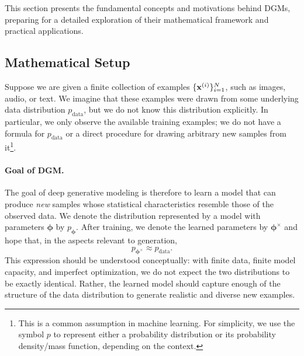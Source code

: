 

This section presents the fundamental concepts and motivations behind DGMs, preparing for a detailed exploration of their mathematical framework and practical applications.


\subsection{Mathematical Setup}\label{subsec:intro-math-setup}
Suppose we are given a finite collection of examples
$\{{\mathbf{x}}^{(i)}\}_{i=1}^N$, such as images, audio, or text.
We imagine that these examples were drawn from some underlying data distribution
$p_{\mathrm{data}}$, but we do not know this distribution explicitly.
In particular, we only observe the available training examples; we do not have a
formula for $p_{\mathrm{data}}$ or a direct procedure for drawing arbitrary new
samples from it\footnote{This is a common assumption in machine learning. For simplicity, we use the symbol $ p $ to represent either a probability distribution or its probability density/mass function, depending on the context.}.


\paragraph{Goal of DGM.}
The goal of deep generative modeling is therefore to learn a model that can
produce \emph{new} samples whose statistical characteristics resemble those of
the observed data.
We denote the distribution represented by a model with parameters
$\bm{\phi}$ by $p_{\bm{\phi}}$.
After training, we denote the learned parameters by $\bm{\phi}^{\times}$ and
hope that, in the aspects relevant to generation,
\[
    p_{\bm{\phi}^{\times}}
    \approx
    p_{\mathrm{data}}.
\]
This expression should be understood conceptually: with finite data, finite
model capacity, and imperfect optimization, we do not expect the two
distributions to be exactly identical.
Rather, the learned model should capture enough of the structure of the data
distribution to generate realistic and diverse new examples.

